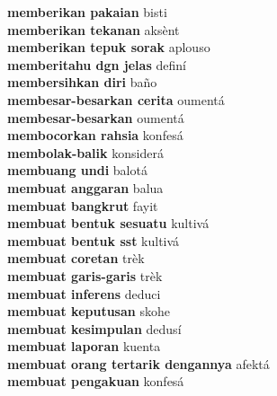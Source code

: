 \textbf{ memberikan pakaian  } bisti \\
\textbf{ memberikan tekanan  } aksènt \\
\textbf{ memberikan tepuk sorak  } aplouso \\
\textbf{ memberitahu dgn jelas  } definí \\
\textbf{ membersihkan diri  } baño \\
\textbf{ membesar-besarkan cerita  } oumentá \\
\textbf{ membesar-besarkan  } oumentá \\
\textbf{ membocorkan rahsia  } konfesá \\
\textbf{ membolak-balik  } konsiderá \\
\textbf{ membuang undi  } balotá \\
\textbf{ membuat anggaran  } balua \\
\textbf{ membuat bangkrut  } fayit \\
\textbf{ membuat bentuk sesuatu  } kultivá \\
\textbf{ membuat bentuk sst  } kultivá \\
\textbf{ membuat coretan  } trèk \\
\textbf{ membuat garis-garis  } trèk \\
\textbf{ membuat inferens  } deduci \\
\textbf{ membuat keputusan  } skohe \\
\textbf{ membuat kesimpulan  } dedusí \\
\textbf{ membuat laporan  } kuenta \\
\textbf{ membuat orang tertarik dengannya  } afektá \\
\textbf{ membuat pengakuan  } konfesá \\
